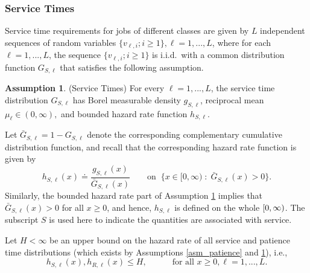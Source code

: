 \documentclass{article}
\theoremstyle{definition}
\newtheorem{assumption}{Assumption}[part]
\numberwithin{equation}{section}
\begin{document}
\subsubsection*{Service Times}
Service time requirements for jobs of different classes are given by $L$ independent sequences of random variables $\{v_{\ell,i};i\geq1\},\ell=1,...,L$, where for each $\ell=1,...,L$, the sequence $\{v_{\ell,i};i\geq1\}$ is i.i.d.\ with a common distribution function $G_{S,\ell}$ that satisfies the following assumption.  
\begin{assumption}\label{asm_service}
  (Service Times) For every $\ell=1,...,L$, the service time distribution $G_{S,\ell}$ has Borel measurable density $g_{S,\ell}$, reciprocal mean $\mu_{\ell}\in(0,\infty),$ and bounded hazard rate function $h_{S,\ell}$.
\end{assumption}
Let $\bar G_{S,\ell}=1-G_{S,\ell}$ denote the corresponding complementary cumulative distribution function, and recall that  the corresponding hazard rate function is given by
\[
h_{S,\ell}(x)\doteq\frac{g_{S,\ell}(x)}{\bar G_{S,\ell}(x)} \quad\quad \text{on} \;\;\{x\in[0,\infty)\;:\; \bar G_{S,\ell}(x)> 0\}.
\]
Similarly, the bounded hazard rate part of Assumption \ref{asm_service} implies that $\bar G_{S,\ell}(x)>0$ for all $x\geq0$, and hence, $h_{S,\ell}$ is defined on the whole $[0,\infty)$. The subscript $S$ is used here to indicate the quantities are associated with service. 


Let $H<\infty$ be an upper bound on the hazard rate of all service and patience time distributions (which exists by Assumptions \ref{asm_patience} and \ref{asm_service}), i.e.,
\begin{equation}\label{def-H}
h_{S,\ell}(x),h_{R,\ell}(x)\leq H,  \quad\quad\quad \text{for all }x\geq0,\ell=1,...,L.
\end{equation}
\end{document}
